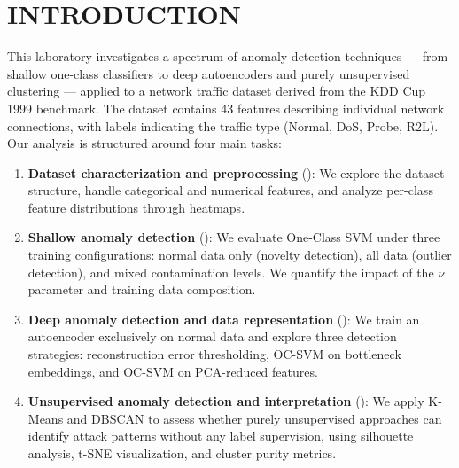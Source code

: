
\section{INTRODUCTION} \label{sec:introduction}

This laboratory investigates a spectrum of anomaly detection techniques --- from shallow one-class classifiers to deep autoencoders and purely unsupervised clustering --- applied to a network traffic dataset derived from the KDD Cup 1999 benchmark.
The dataset contains 43 features describing individual network connections, with labels indicating the traffic type (Normal, DoS, Probe, R2L).
Our analysis is structured around four main tasks:
\begin{enumerate}
    \item \textbf{Dataset characterization and preprocessing} (): We explore the dataset structure, handle categorical and numerical features, and analyze per-class feature distributions through heatmaps.
    \item \textbf{Shallow anomaly detection} (): We evaluate One-Class SVM under three training configurations: normal data only (novelty detection), all data (outlier detection), and mixed contamination levels. We quantify the impact of the $\nu$ parameter and training data composition.
    \item \textbf{Deep anomaly detection and data representation} (): We train an autoencoder exclusively on normal data and explore three detection strategies: reconstruction error thresholding, OC-SVM on bottleneck embeddings, and OC-SVM on PCA-reduced features.
    \item \textbf{Unsupervised anomaly detection and interpretation} (): We apply K-Means and DBSCAN to assess whether purely unsupervised approaches can identify attack patterns without any label supervision, using silhouette analysis, t-SNE visualization, and cluster purity metrics.
\end{enumerate}
